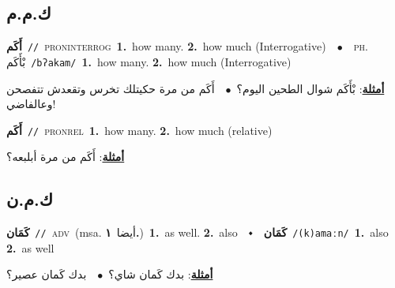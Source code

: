 \documentclass[10pt,a4paper,twoside]{article} %
\begin{document}
\begin{multicols}{2}
\vspace{-3mm}
\subsection*{\color{blue}\foreignlanguage{arabic}{ك.م.م}\color{blue}{ (ntws)}} 

{\setlength\topsep{0pt}\textbf{\foreignlanguage{arabic}{أَكَم}}\ {\color{gray}\texttt{//}\color{black}}\ \textsc{pron\textunderscore interrog}\ \textbf{1.}~how many.  \textbf{2.}~how much (Interrogative)\ \ $\bullet$\ \ \textsc{ph.} \color{gray} \foreignlanguage{arabic}{بْأَكَم}\color{black}\ {\color{gray}\texttt{/{\sffamily bʔakam}/}\color{black}}\ \textbf{1.}~how many.  \textbf{2.}~how much (Interrogative)\  \begin{flushright}\color{gray}\foreignlanguage{arabic}{\textbf{\underline{\foreignlanguage{arabic}{أمثلة}}}: بْأَكَم شوال الطحين اليوم؟\ $\bullet$\ \  أَكَم من مرة حكيتلك تخرس وتقعدش تتفصحن وعالفاضي!}\end{flushright}\color{black}} \vspace{2mm}

{\setlength\topsep{0pt}\textbf{\foreignlanguage{arabic}{أَكَم}}\ {\color{gray}\texttt{//}\color{black}}\ \textsc{pron\textunderscore rel}\ \textbf{1.}~how many.  \textbf{2.}~how much (relative)\  \begin{flushright}\color{gray}\foreignlanguage{arabic}{\textbf{\underline{\foreignlanguage{arabic}{أمثلة}}}: أَكَم من مرة أبلبعه؟}\end{flushright}\color{black}} \vspace{2mm}

\vspace{-3mm}
\subsection*{\color{blue}\foreignlanguage{arabic}{ك.م.ن}\color{blue}{}} 

{\setlength\topsep{0pt}\textbf{\foreignlanguage{arabic}{كَمَان}}\ {\color{gray}\texttt{//}\color{black}}\ \textsc{adv}\ \color{gray}(msa. \foreignlanguage{arabic}{أيضا}~\foreignlanguage{arabic}{\textbf{١.}})\color{black}\ \textbf{1.}~as well.  \textbf{2.}~also\ \ $\smblkdiamond$\ \ \setlength\topsep{0pt}\textbf{\foreignlanguage{arabic}{كَمَان}}\ {\color{gray}\texttt{/(k)amaːn/}\color{black}}\ \textbf{1.}~also  \textbf{2.}~as well\  \begin{flushright}\color{gray}\foreignlanguage{arabic}{\textbf{\underline{\foreignlanguage{arabic}{أمثلة}}}: بدك كَمان شاي؟\ $\bullet$\ \  بدك كَمان عصير؟}\end{flushright}\color{black}} \vspace{2mm}


\end{multicols}
\end{document}
